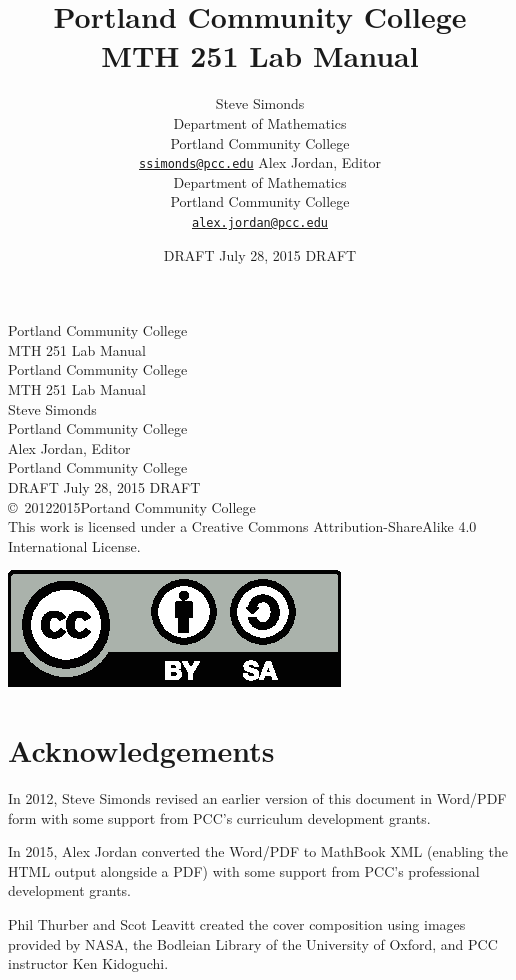 \documentclass[12pt,]{book}
\title{Portland Community College\\MTH 251 Lab Manual}
\author{Steve Simonds\\
Department of Mathematics\\
Portland Community College\\
\href{mailto:ssimonds@pcc.edu}{\nolinkurl{ssimonds@pcc.edu}}
Alex Jordan, Editor\\
Department of Mathematics\\
Portland Community College\\
\href{mailto:alex.jordan@pcc.edu}{\nolinkurl{alex.jordan@pcc.edu}}
}
\date{DRAFT July 28, 2015 DRAFT}
\theoremstyle{plain}
\theoremstyle{definition}
\numberwithin{equation}{section}
\begin{document}
\frontmatter
\thispagestyle{empty}
{\centering
\vspace*{0.28\textheight}
{\Huge Portland Community College\\MTH 251 Lab Manual}\\}
\clearpage
\thispagestyle{empty}
\null%
\clearpage
\thispagestyle{empty}
{\centering
\vspace*{0.14\textheight}
{\Huge Portland Community College\\MTH 251 Lab Manual}\\[3\baselineskip]
{\Large Steve Simonds}\\[0.5\baselineskip]
{\Large Portland Community College}\\[3\baselineskip]
{\Large Alex Jordan, Editor}\\[0.5\baselineskip]
{\Large Portland Community College}\\[3\baselineskip]
{\Large DRAFT July 28, 2015 DRAFT}\\}
\clearpage
\thispagestyle{empty}
\noindent\copyright\ 2012\textendash{}2015\quad{}Portand Community College\\[0.5\baselineskip]
This work is licensed under a Creative Commons Attribution-ShareAlike 4.0 International License.%

            \par
\includegraphics[]{../images/by-sa.eps}%
\par
{}
\null\clearpage
\chapter*{Acknowledgements}\label{acknowledgement-1}
In 2012, Steve Simonds revised an earlier version of this document in Word/PDF form with some support from PCC's curriculum development grants.%
\par
In 2015, Alex Jordan converted the Word/PDF to MathBook XML (enabling the HTML output alongside a PDF) with some support from PCC's professional development grants.%
\par
Phil Thurber and Scot Leavitt created the cover composition using images provided by NASA, the Bodleian Library of the University of Oxford, and PCC instructor Ken Kidoguchi.%
\end{document}
